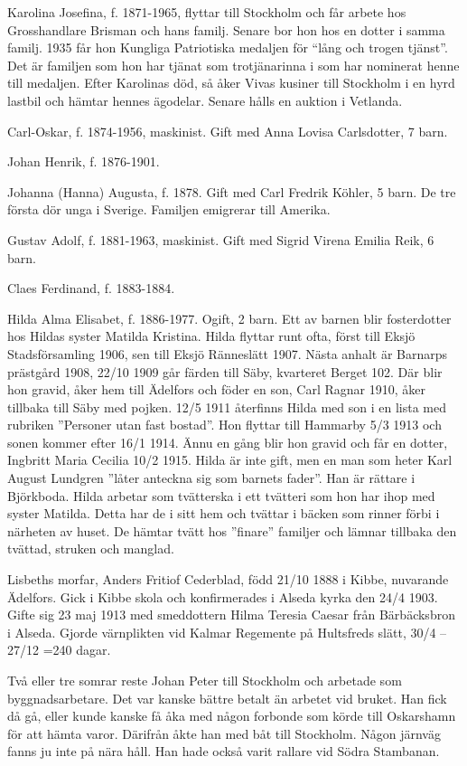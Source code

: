 Karolina Josefina, f. 1871-1965, flyttar till Stockholm och får arbete hos Grosshandlare Brisman och hans familj. Senare bor hon hos en dotter i samma familj. 1935 får hon Kungliga Patriotiska medaljen för “lång och trogen tjänst”. Det är familjen som hon har tjänat som trotjänarinna i som har nominerat henne till medaljen. 
Efter Karolinas död, så åker Vivas kusiner till Stockholm i en hyrd lastbil och hämtar hennes ägodelar. Senare hålls en auktion i Vetlanda.

Carl-Oskar, f. 1874-1956, maskinist. Gift med Anna Lovisa Carlsdotter, 7 barn.

Johan Henrik, f. 1876-1901.

Johanna (Hanna) Augusta, f. 1878. Gift med Carl Fredrik Köhler, 5 barn. De tre första dör unga i Sverige. Familjen emigrerar till Amerika.

Gustav Adolf, f. 1881-1963, maskinist. Gift med Sigrid Virena Emilia Reik, 6 barn.

Claes Ferdinand, f. 1883-1884.

Hilda Alma Elisabet, f. 1886-1977. Ogift, 2 barn. Ett av barnen blir fosterdotter hos Hildas syster Matilda Kristina. Hilda flyttar runt ofta, först till Eksjö Stadsförsamling 1906, sen till Eksjö Ränneslätt 1907. Nästa anhalt är Barnarps prästgård 1908,  22/10 1909 går färden till Säby, kvarteret Berget 102. Där blir hon gravid, åker hem till Ädelfors och föder en son, Carl Ragnar 1910, åker tillbaka till Säby med pojken. 12/5 1911 återfinns Hilda med son i en lista med rubriken
”Personer utan fast bostad”. Hon  flyttar till Hammarby 5/3 1913 och sonen kommer efter 16/1 1914. Ännu en gång blir hon gravid  och får en dotter, Ingbritt Maria Cecilia 10/2 1915. Hilda är inte gift, men en man som heter Karl August Lundgren ”låter anteckna sig som barnets fader”. Han är rättare i Björkboda.
Hilda arbetar som tvätterska i ett tvätteri som hon har ihop med syster Matilda. Detta har de i sitt hem och tvättar i bäcken som rinner förbi i närheten av huset. De hämtar tvätt hos ”finare” familjer och lämnar tillbaka den tvättad, struken och manglad.

Lisbeths morfar, Anders Fritiof Cederblad, född 21/10 1888 i Kibbe, nuvarande Ädelfors. Gick i Kibbe skola och konfirmerades i Alseda kyrka den 24/4 1903. Gifte sig 23 maj 1913 med smeddottern Hilma Teresia Caesar från Bärbäcksbron i Alseda.
Gjorde värnplikten vid Kalmar Regemente på Hultsfreds slätt, 30/4 – 27/12 =240 dagar.

Två eller tre somrar reste Johan Peter till Stockholm och arbetade som byggnadsarbetare.
Det var kanske bättre betalt än arbetet vid bruket. Han fick då gå, eller kunde kanske få åka med någon forbonde som körde till Oskarshamn för att hämta varor. Därifrån åkte han med båt till Stockholm. Någon järnväg fanns ju inte på nära håll. Han hade också varit rallare vid Södra Stambanan.

